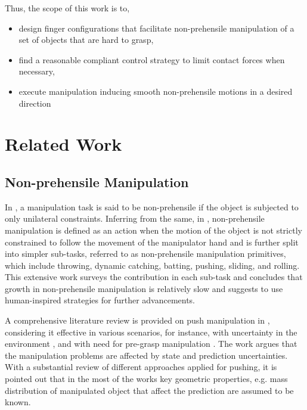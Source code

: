 \documentclass[rnd]{mas_proposal}
\begin{document}
Thus, the scope of this work is to,
\begin{itemize}
\item design finger configurations that facilitate non-prehensile manipulation of a  set of objects that are hard to grasp,
\item find a reasonable compliant control strategy to limit contact forces when necessary,
\item execute manipulation inducing smooth non-prehensile motions in a desired direction 
\end{itemize}

\newpage
\section{Related Work}


\subsection{Non-prehensile Manipulation}
In \cite{lynch1996nonprehensile}, a manipulation task is said to be non-prehensile if the object is subjected to only unilateral constraints. Inferring from the same, in  \cite{ruggiero2018nonprehensile}, non-prehensile manipulation is defined as an action when the motion of the object is not strictly constrained to follow the movement of the manipulator hand and is further split into simpler sub-tasks, referred to as non-prehensile manipulation primitives, which include throwing, dynamic catching, batting, pushing, sliding, and rolling. This extensive work surveys the contribution in each sub-task and concludes that growth in non-prehensile manipulation is relatively slow and suggests to use human-inspired strategies for further advancements.

A comprehensive literature review is provided on push manipulation in \cite{stuber2019let}, considering it effective in various scenarios, for instance, with uncertainty in the environment \cite{dogar2010push}, and with need for pre-grasp manipulation \cite{king2013pregrasp,zeng2018learning}. The work argues that the manipulation problems are affected by state and prediction uncertainties. With a substantial review of different approaches applied for pushing, it is pointed out that in the most of the works key geometric properties, e.g. mass distribution of manipulated object that affect the prediction are assumed to be known. 
\end{document}
